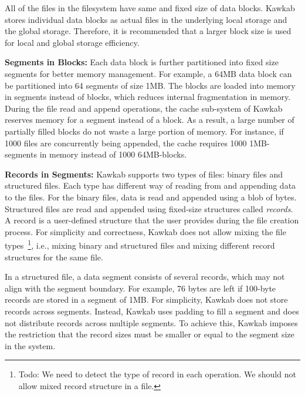 \documentclass[]{article}
\newcommand{\subtopic}[1]{\vspace{1.5pt} \noindent \textbf{#1}}
\begin{document}
All of the files in the filesystem have same and fixed size of data blocks. 
Kawkab stores individual data blocks as actual files in the underlying 
local storage and the global storage. Therefore, it is recommended that 
a larger block size is used for local and global 
storage efficiency. 

\subtopic{Segments in Blocks:} Each data block is further partitioned into
fixed size segments for better memory management. For example, a 64MB data
block can be partitioned into 64 segments of size 1MB.  
The blocks are loaded into memory in segments instead of blocks, which reduces internal
fragmentation in memory.  During the file read and append operations, the cache
sub-system of Kawkab reserves memory for a segment instead of a block. As a
result, a large number of partially filled blocks do not waste a large portion
of memory. For instance, if 1000 files are concurrently being appended, the
cache requires 1000 1MB-segments in memory instead of 1000 64MB-blocks.



\subtopic{Records in Segments:} 
Kawkab supports two types of files: binary files and structured files.
Each type has different way of reading from and appending data to the files.
For the binary files, data is read and appended using a blob of bytes.
Structured files are read and appended using fixed-size structures
called \textit{records}. A record is a user-defined structure that
the user provides during the file creation process.
For simplicity and correctness, Kawkab does not allow mixing the file
types~\footnote{Todo: We need to detect the type of record in each operation. We
should not allow mixed record structure in a file.}, i.e., mixing binary and
structured files and mixing different record structures for the same file.


In a structured file, a data segment consists of several records, which may not
align with the segment boundary. For example, 76 bytes are left if 100-byte
records are stored in a segment of 1MB. For simplicity, Kawkab does not store
records across segments.  Instead, Kawkab uses padding to fill a segment and
does not distribute records across multiple segments. To achieve this, Kawkab
imposes the restriction that the record sizes must be smaller or equal to the
segment size in the system. 
\end{document}
